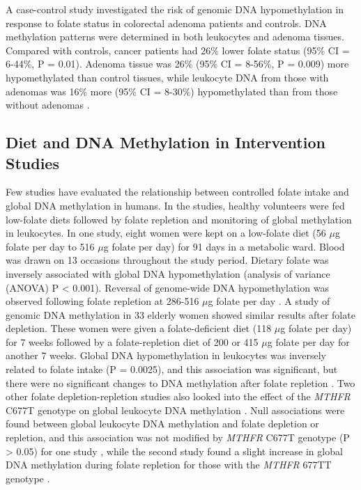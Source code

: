 \noindent A case-control study investigated the risk of genomic DNA hypomethylation in response to folate status in colorectal adenoma patients and controls. DNA methylation patterns were determined in both leukocytes and adenoma tissues. Compared with controls, cancer patients had 26\% lower folate status (95\% CI = 6-44\%, P = 0.01). Adenoma tissue was 26\% (95\% CI = 8-56\%, P = 0.009) more hypomethylated than control tissues, while leukocyte DNA from those with adenomas was 16\% more (95\% CI = 8-30\%) hypomethylated than from those without adenomas \cite{c246}. 
 
\subsection{Diet and DNA Methylation in Intervention Studies} %
\noindent Few studies have evaluated the relationship between controlled folate intake and global DNA methylation in humans. In the studies, healthy volunteers were fed low-folate diets followed by folate repletion and monitoring of global methylation in leukocytes. In one study, eight women were kept on a low-folate diet (56 $\mu$g folate per day to 516 $\mu$g folate per day) for 91 days in a metabolic ward. Blood was drawn on 13 occasions throughout the study period. Dietary folate was inversely associated with global DNA hypomethylation (analysis of variance (ANOVA) P < 0.001). Reversal of genome-wide DNA hypomethylation was observed following folate repletion at 286-516 $\mu$g folate per day \cite{c247}. A study of genomic DNA methylation in 33 elderly women showed similar results after folate depletion. These women were given a folate-deficient diet (118 $\mu$g folate per day) for 7 weeks followed by a folate-repletion diet of 200 or 415 $\mu$g folate per day for another 7 weeks. Global DNA hypomethylation in leukocytes was inversely related to folate intake (P = 0.0025), and this association was significant, but there were no significant changes to DNA methylation after folate repletion \cite{c248}. Two other folate depletion-repletion studies also looked into the effect of the \emph{MTHFR} C677T genotype on global leukocyte DNA methylation \cite{c249,c250}. Null associations were found between global leukocyte DNA methylation and folate depletion or repletion, and this association was not modified by \emph{MTHFR} C677T genotype (P > 0.05) for one study \cite{c240}, while the second study found a slight increase in global DNA methylation during folate repletion for those with the \emph{MTHFR} 677TT genotype \cite{c250}. 
 
